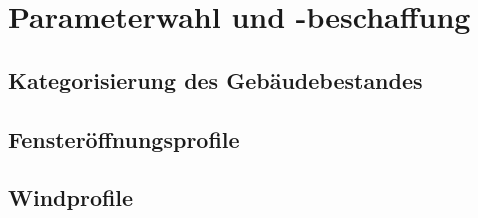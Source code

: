 \chapter{Parameterwahl und -beschaffung}

\section{Kategorisierung des Gebäudebestandes}
\label{sec:Sektion41}

\section{Fensteröffnungsprofile}
\label{sec:Sektion42}

\section{Windprofile}
\label{sec:Sektion43}